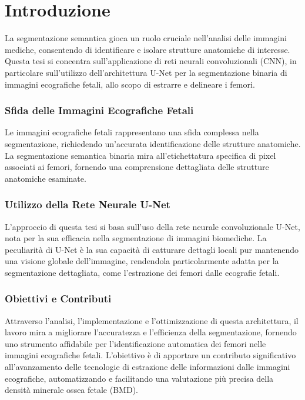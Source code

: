 \chapter{Introduzione}
\label{chap:Introduzione}


La segmentazione semantica gioca un ruolo cruciale nell'analisi delle immagini
mediche, consentendo di identificare e isolare strutture anatomiche di
interesse. Questa tesi si concentra sull'applicazione di reti neurali
convoluzionali (CNN), in particolare sull'utilizzo dell'architettura U-Net per
la segmentazione binaria di immagini ecografiche fetali, allo scopo di estrarre
e delineare i femori.

\subsection{Sfida delle Immagini Ecografiche Fetali}

Le immagini ecografiche fetali rappresentano una sfida complessa nella
segmentazione, richiedendo un'accurata identificazione delle strutture
anatomiche. La segmentazione semantica binaria mira all'etichettatura
specifica di pixel associati ai femori, fornendo una comprensione dettagliata
delle strutture anatomiche esaminate.

\subsection{Utilizzo della Rete Neurale U-Net}
L'approccio di questa tesi si basa sull'uso della rete neurale convoluzionale
U-Net, nota per la sua efficacia nella segmentazione di immagini biomediche. La
peculiarità di U-Net è la sua capacità di catturare dettagli locali pur
mantenendo una visione globale dell'immagine, rendendola particolarmente adatta
per la segmentazione dettagliata, come l'estrazione dei femori dalle ecografie
fetali.

\subsection{Obiettivi e Contributi}
Attraverso l'analisi, l'implementazione e l'ottimizzazione di questa
architettura, il lavoro mira a migliorare l'accuratezza e l'efficienza della
segmentazione, fornendo uno strumento affidabile per l'identificazione
automatica dei femori nelle immagini ecografiche fetali. L'obiettivo è di
apportare un contributo significativo all'avanzamento delle tecnologie di
estrazione delle informazioni dalle immagini ecografiche, automatizzando e
facilitando una valutazione più precisa della densità minerale ossea fetale
(BMD).

